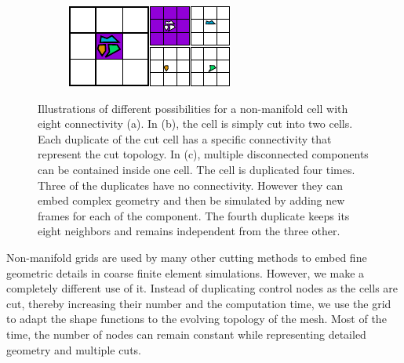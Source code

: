 \begin{figure}[!h]
\begin{subfigure}[b]{0.30\linewidth}
		\caption{\label{fig:simplecut}}
	\end{subfigure}
	\hfill
	\begin{subfigure}[b]{0.40\linewidth}
		\centering
		\includegraphics[width=\linewidth]{images/cutting-mig2015/little_pieces.pdf}
		\caption{\label{fig:littlePieces}}
	\end{subfigure}
	\caption[Frame-based cutting: Non-manifold grid illustration]{\label{fig:nonmanifoldgridillustration}
		Illustrations of different possibilities for a non-manifold cell with eight connectivity (a). In (b), the cell is simply cut into two cells. Each duplicate of the cut cell has a specific connectivity that represent the cut topology. In (c), multiple disconnected components can be contained inside one cell. The cell is duplicated four times. Three of the duplicates have no connectivity. However they can embed complex geometry and then be simulated by adding new frames for each of the component. The fourth duplicate keeps its eight neighbors and remains independent from the three other.}
\end{figure}

Non-manifold grids are used by many other cutting methods to embed fine geometric details in coarse finite element simulations. However, we make a completely different use of it. Instead of duplicating control nodes as the cells are cut, thereby increasing their number and the computation time, we use the grid to adapt the shape functions to the evolving topology of the mesh. Most of the time, the number of nodes can remain constant while representing detailed geometry and multiple cuts.

\newpage 

